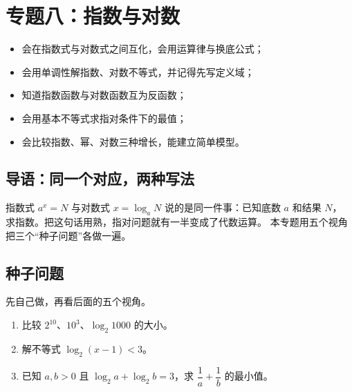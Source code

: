 \section{专题八：指数与对数}

\begin{learnobjective}
\begin{itemize}
  \item 会在指数式与对数式之间互化，会用运算律与换底公式；
  \item 会用单调性解指数、对数不等式，并记得先写定义域；
  \item 知道指数函数与对数函数互为反函数；
  \item 会用基本不等式求指对条件下的最值；
  \item 会比较指数、幂、对数三种增长，能建立简单模型。
\end{itemize}
\end{learnobjective}

\begin{preview}
\subsection{导语：同一个对应，两种写法}
指数式 $a^x=N$ 与对数式 $x=\log_a N$ 说的是同一件事：已知底数 $a$ 和结果 $N$，
求指数。把这句话用熟，指对问题就有一半变成了代数运算。
本专题用五个视角把三个“种子问题”各做一遍。

\subsection{种子问题}
先自己做，再看后面的五个视角。
\begin{enumerate}
  \item 比较 $2^{10}$、$10^3$、$\log_2 1000$ 的大小。
  \item 解不等式 $\log_2(x-1)<3$。
  \item 已知 $a,b>0$ 且 $\log_2 a+\log_2 b=3$，求 $\dfrac1a+\dfrac1b$ 的最小值。
\end{enumerate}
\end{preview}

